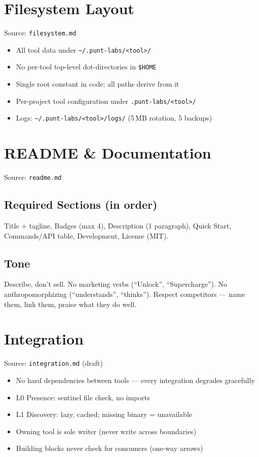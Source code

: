 \documentclass[a4paper,10pt]{article}
\begin{document}
\section{Filesystem Layout}
\label{sec:filesystem}
Source: \texttt{filesystem.md}

\begin{itemize}
  \item All tool data under \texttt{\textasciitilde/.punt-labs/<tool>/}
  \item No per-tool top-level dot-directories in \texttt{\$HOME}
  \item Single root constant in code; all paths derive from it
  \item Per-project tool configuration under \texttt{.punt-labs/<tool>/}
  \item Logs: \texttt{\textasciitilde/.punt-labs/<tool>/logs/} (5\,MB rotation, 5 backups)
\end{itemize}

\section{README \& Documentation}
\label{sec:readme}
Source: \texttt{readme.md}

\subsection{Required Sections (in order)}
Title + tagline, Badges (max 4), Description (1 paragraph), Quick Start,
Commands/API table, Development, License (MIT).

\subsection{Tone}
Describe, don't sell. No marketing verbs (``Unlock'', ``Supercharge'').
No anthropomorphizing (``understands'', ``thinks'').
Respect competitors --- name them, link them, praise what they do well.

\section{Integration}
\label{sec:integration}
Source: \texttt{integration.md} (draft)

\begin{itemize}
  \item No hard dependencies between tools --- every integration degrades gracefully
  \item L0 Presence: sentinel file check, no imports
  \item L1 Discovery: lazy, cached; missing binary = unavailable
  \item Owning tool is sole writer (never write across boundaries)
  \item Building blocks never check for consumers (one-way arrows)
\end{itemize}
\end{document}
